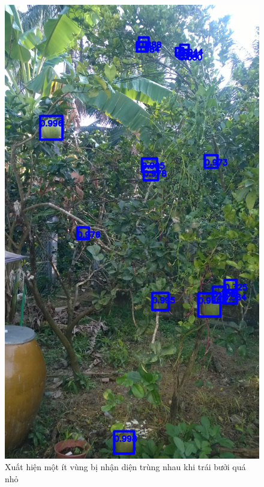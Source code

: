\begin{center}
    \begin{figure}[H]
    \centering
    \includegraphics[width=0.7\columnwidth]{images/chap3/demo_010.jpg}
    \caption{Xuất hiện một ít vùng bị nhận diện trùng nhau khi trái bưởi quá nhỏ}
    \label{chap3:lack3}
    \end{figure}
\end{center}
